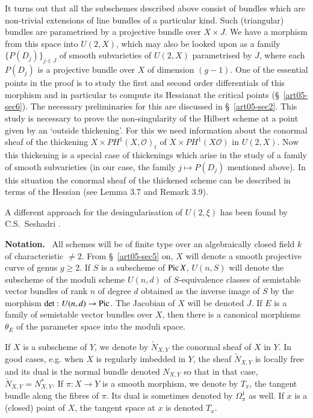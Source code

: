 It turns out that all the subschemes described above consist of
bundles which are non-trivial extensions of line bundles of a
particular kind. Such (triangular) bundles are parametrised by a
projective bundle over $X\times J$. We have a morphism from this space
into $U(2,X)$, which may also be looked upon as a family
$\{P(D_{j})\}_{j\in J}$ of smooth subvarieties of $U(2,X)$
parametrised by $J$, where each $P(D_{j})$ is a projective bundle over
$X$ of dimension $(g-1)$. One of the essential points in the proof is
to study the first and second order differentials of this morphism and
in particular to compute its Hessian\pageoriginale at the critical
points (\S~\ref{art05-sec6}). The necessary preliminaries for this are
discussed in \S~\ref{art05-sec2}. This study is necessary to prove the
non-singularity of the Hilbert scheme at a point given by an `outside
thickening'. For this we need information about the conormal sheaf of
the thickening $X\times PH^{1}(X,\mathscr{O})_{t}$ of $X\times
PH^{1}(X\mathscr{O})$ in $U(2,X)$. Now this thickening is a special
case of thickenings which arise in the study of a family of smooth
subvarieties (in our case, the family $j\mapsto P(D_{j})$ mentioned
above). In this situation the conormal sheaf of the thickened scheme
can be described in terms of the Hessian (see Lemma 3.7 and Remark
3.9).

A different approach for the desingularisation of $U(2,\xi)$ has been
found by C.S.~Seshadri \cite{art05-key10}.

\medskip
\noindent
{\bf Notation.}~
All schemes will be of finite type over an algebraically closed field
$k$ of characteristic $\neq 2$. From \S~\ref{art05-sec5} on, $X$ will
denote a smooth projective curve of genus $g\geq 2$. If $S$ is a
subscheme of $\operatorname{Pic} X$, $U(n,S)$ will denote the subscheme of the
moduli scheme $U(n,d)$ of $S$-equivalence classes of semistable vector
bundles of rank $n$ of degree $d$ obtained as the inverse image of $S$
by the morphism $\det : U(n,d)\to \operatorname{Pic}$. The Jacobian of $X$ will be
denoted $J$. If $E$ is a family of semistable vector bundles over $X$,
then there is a canonical morphisms $\theta_{E}$ of the parameter
space into the moduli space.

If $X$ is a subscheme of $Y$, we denote by $\check{N}_{X,Y}$ the
conormal sheaf of $X$ in $Y$. In good cases, e.g. when $X$ is
regularly imbedded in $Y$, the sheaf $\check{N}_{X,Y}$ is locally free
and its dual is the normal bundle denoted $N_{X,Y}$ so that in that
case, $\check{N}_{X,Y}=N^{*}_{X,Y}$. If $\pi:X\to Y$ is a smooth
morphism, we denote by $T_{\pi}$, the tangent bundle along the fibres
of $\pi$. Its dual is sometimes denoted by $\Omega^{1}_{\pi}$ as
well. If $x$ is a (closed) point of $X$, the tangent space at $x$ is
denoted $T_{x}$. 


